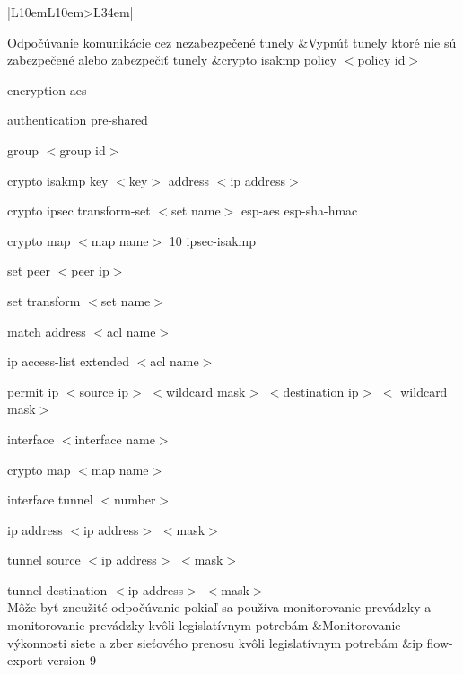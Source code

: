 \begin{longtable}[!htbp]{|L{10em}L{10em}>{\selectfont}L{34em}|}
	
	
	
	 Odpočúvanie komunikácie  cez nezabezpečené tunely	&Vypnúť tunely ktoré nie sú zabezpečené alebo zabezpečiť tunely	&crypto isakmp policy $<$policy id$>$
	
	\hspace{0.5em}encryption aes
	
	\hspace{0.5em}authentication pre-shared
	
	\hspace{0.5em}group $<$group id$>$
	
	crypto isakmp key $<$key$>$ address $<$ip address$>$ 
	
	crypto ipsec transform-set $<$set name$>$ esp-aes esp-sha-hmac
	
	\hspace{0.5em}crypto map $<$map name$>$ 10 ipsec-isakmp
	
	\hspace{1em}set peer $<$peer ip$>$
	
	\hspace{1em}set transform $<$set name$>$ 
	
	\hspace{1em}match address $<$acl name$>$
	
	ip access-list extended $<$acl name$>$
	
	\hspace{0.5em}permit ip $<$source ip$>$ $<$wildcard mask$>$ $<$destination ip$>$ $<$ wildcard mask$>$
	
	interface $<$interface name$>$
	
	\hspace{0.5em}crypto map $<$map name$>$
	
	interface tunnel $<$number$>$
	
	\hspace{0.5em}ip address $<$ip address$>$ $<$mask$>$
	
	\hspace{0.5em}tunnel source $<$ip address$>$ $<$mask$>$
	
	\hspace{0.5em}tunnel destination $<$ip address$>$ $<$mask$>$\\
	
	
	
	
	Môže byť zneužité odpočúvanie pokiaľ sa používa monitorovanie prevádzky a monitorovanie prevádzky kvôli legislatívnym potrebám	&Monitorovanie výkonnosti siete a zber sieťového prenosu kvôli legislatívnym potrebám	&ip flow-export version 9
	

\end{longtable}
